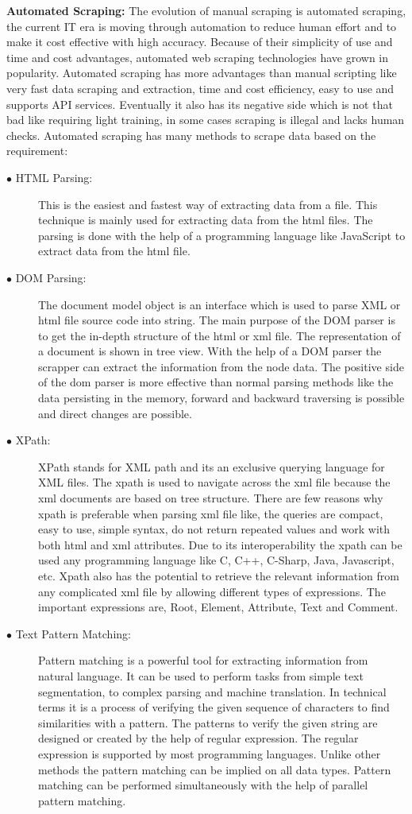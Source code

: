 {\bf Automated  Scraping:} The evolution of manual scraping is automated scraping, the current IT era is moving through automation to reduce human effort  and to make it cost effective with high accuracy. Because of their simplicity of use and time and cost advantages, automated web scraping technologies have grown in popularity. Automated scraping has more advantages than manual scripting like very fast data scraping and extraction, time and cost efficiency, easy to use and supports API services. Eventually it also has its negative side which is not that bad like requiring light training, in some cases scraping is illegal and lacks human checks. Automated scraping has many methods to scrape data based on the requirement:
\begin{description}
	\item [$\bullet$ HTML Parsing:] This is the easiest and fastest way of extracting data from a file. This technique is mainly used for extracting data from the html files. The parsing is done with the help of a programming language like JavaScript to extract data from the html file. 
	
	\item [$\bullet$ DOM Parsing:] The document model object is an interface which is used to parse XML or html file source code into string. The main purpose of the DOM parser is to get the in-depth structure of the html or xml file. The representation of a document is shown in tree view. With the help of a DOM parser the scrapper can extract the information from the node data. The positive side of the dom parser is more effective than normal parsing methods like the data persisting in the memory, forward and backward traversing is possible and direct changes are possible.
	\item [$\bullet$ XPath:] XPath stands for XML path and its an exclusive querying language for XML files. The xpath is used to navigate across the xml file because the xml documents are based on tree structure. There are few reasons why xpath is preferable when parsing xml file like, the queries are compact, easy to use, simple syntax, do not return repeated values and work with both html and xml attributes. Due to its interoperability the xpath can be used any programming language like C, C++, C-Sharp, Java, Javascript, etc. Xpath also has the potential to retrieve the relevant information from any complicated xml file by allowing different types of expressions. The important expressions are, Root, Element, Attribute, Text and Comment.
	\item [$\bullet$ Text Pattern Matching:] Pattern matching is a powerful tool for extracting information from natural language. It can be used to perform tasks from simple text segmentation, to complex parsing and machine translation. In technical terms it is a process of verifying the given sequence of characters to find similarities with a pattern. The patterns to verify the given string are designed or created by the help of regular expression. The regular expression is supported by most programming languages. Unlike other methods the pattern matching can be implied on all data types. Pattern matching can be performed simultaneously with the help of parallel pattern matching. 
\end{description}
